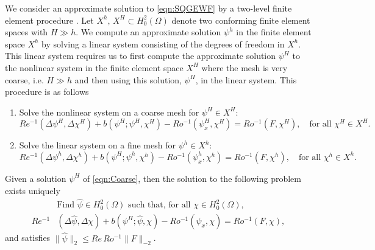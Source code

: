 We consider an approximate solution to \eqref{eqn:SQGEWF} by a two-level finite
element procedure \cite{Fairag98,Layton93}. Let $X^h,\, X^H \subset
H^2_0(\Omega)$ denote two conforming finite element spaces with $H \gg h$. We
compute an approximate solution $\psi^h$ in the finite element space $X^h$ by
solving a linear system consisting of the degrees of freedom in $X^h$.  This
linear system requires us to first compute the approximate solution $\psi^H$ to
the nonlinear system in the finite element space $X^H$ where the mesh is very
coarse, i.e. $H \gg h$ and then using this solution, $\psi^H$, in the linear
system. This procedure is as follows

\begin{algorithm}%
  \caption{}%
  \label{alg:TwoLevel}
  \begin{enumerate}[Step 1:]
    \item Solve the nonlinear system on a coarse mesh for $\psi^H\in X^H$:
    \begin{equation}
      Re^{-1} (\Delta \psi^H, \Delta \chi^H)
        + b(\psi^H; \psi^H,\chi^H)
        - Ro^{-1} (\psi_x^H,\chi^H)
        = Ro^{-1} (F,\chi^H), \quad \text{for all } \chi^H \in X^H.
      \label{eqn:Coarse}
    \end{equation}
    \item Solve the linear system on a fine mesh for $\psi^h\in X^h$:
    \begin{equation}
      Re^{-1} (\Delta \psi^h, \Delta \chi^h)
        + b(\psi^H; \psi^h,\chi^h)
        - Ro^{-1} (\psi_x^h,\chi^h)
        = Ro^{-1} (F,\chi^h), \quad \text{for all } \chi^h \in X^h.
      \label{eqn:Fine}
    \end{equation}
  \end{enumerate}
\end{algorithm}
\begin{lemma}\label{lma:Fine}
  Given a solution $\psi^H$ of \eqref{eqn:Coarse}, then the solution to the
  following problem exists uniquely
    \begin{equation}
      \begin{split}
        &\text{Find } \hat{\psi} \in H^2_0(\Omega) \text{ such that, for all }
          \chi\in H^2_0(\Omega), \\
        Re^{-1}&(\Delta \hat{\psi}, \Delta \chi)
          + b(\psi^H; \hat{\psi}, \chi)
          - Ro^{-1} (\hat{\psi}_x,\chi)
          = Ro^{-1} (F,\chi),
      \end{split}
      \label{eqn:FineProb}
    \end{equation}
    and satisfies $\|\hat{\psi}\|_2 \le Re\, Ro^{-1} \|F\|_{-2}$.
\end{lemma}
